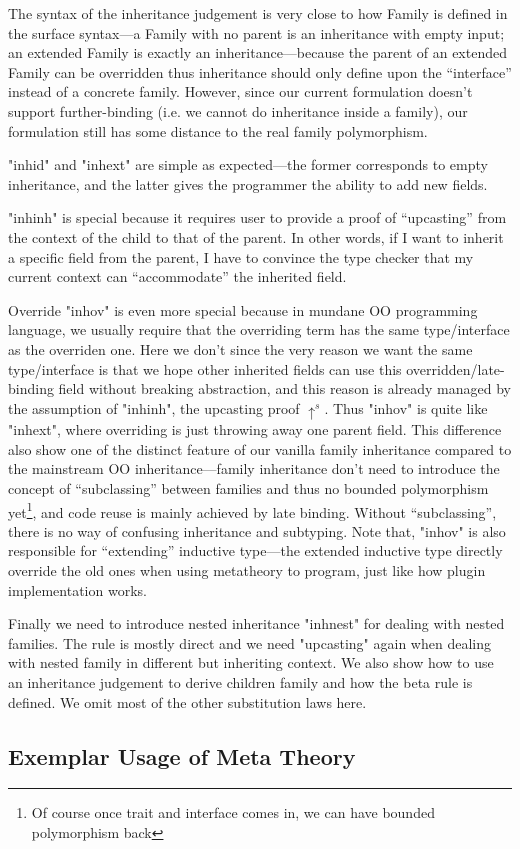 The syntax of the inheritance judgement is very close to how Family is
defined in the surface syntax---a Family with no parent is an
inheritance with empty input; an extended Family is exactly an
inheritance---because the parent of an extended Family can be overridden
thus inheritance should only define upon the ``interface'' instead of a
concrete family. However, since our current formulation doesn't support
further-binding (i.e. we cannot do inheritance inside a family), our
formulation still has some distance to the real family polymorphism. 

"inhid" and "inhext" are simple as expected---the former corresponds to
empty inheritance, and the latter gives the programmer the ability to
add new fields.

"inhinh" is special because it requires user to provide a proof of
``upcasting'' from the context of the child to that of the parent.
In other words, if I want to inherit a specific field from the parent, I
have to convince the type checker that my current context can
``accommodate'' the inherited field. 

Override "inhov" is even more special because in mundane OO programming language, we usually require that the overriding term has the same type/interface as the overriden one.  Here we don't since the very reason we want the same type/interface is that we hope other inherited fields can use this overridden/late-binding field without breaking abstraction, and this reason is already managed by the assumption of "inhinh", the upcasting proof $\uparrow^s$. Thus "inhov" is quite like "inhext", where overriding is just throwing away one parent field. This difference also show one of the distinct feature of our vanilla family inheritance compared to the mainstream OO inheritance---family inheritance don't need to introduce the concept of ``subclassing'' between families and thus no bounded polymorphism yet\footnote{Of course once trait and interface comes in, we can have bounded polymorphism back}, and code reuse is mainly achieved by late binding. Without ``subclassing'', there is no way of confusing inheritance and subtyping. Note that, "inhov" is also responsible for ``extending'' inductive type---the extended inductive type directly override the old ones when using metatheory to program, just like how plugin implementation works.

Finally we need to introduce nested inheritance "inhnest" for dealing with nested families. The rule is mostly direct and we need "upcasting" again when dealing with nested family in different but inheriting context.  We also show how to use an inheritance judgement to derive children family and how the beta rule is defined. We omit most of the other substitution laws here.



\subsection{Exemplar Usage of Meta Theory}
